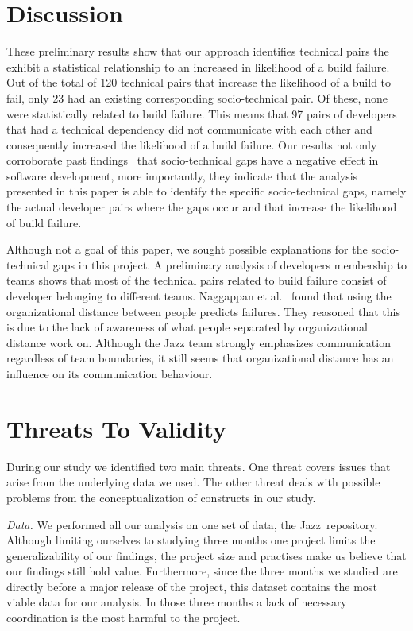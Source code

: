 \documentclass[conference]{IEEEtran}
\begin{document}
\section{Discussion}
These preliminary results show that our approach identifies technical pairs the exhibit a statistical relationship to an increased in likelihood of a build failure.
Out of the total of 120 technical pairs that increase the likelihood of a
build to fail, only 23 had an existing
corresponding socio-technical pair. Of these, none were statistically
related to build failure. This means that 97 pairs of developers that had a
technical dependency did not communicate with each other and
consequently increased the likelihood of a build failure. Our results not only
corroborate past findings~\cite{cataldo:cscw:2006,cataldo:esem:2008} that socio-technical gaps
have a negative effect in software development, more importantly, they indicate
that the analysis presented in this paper is able to identify the specific
socio-technical gaps, namely the actual developer pairs where the gaps occur
and that increase the likelihood of build failure. 

Although not a goal of this paper, we sought possible explanations for the
socio-technical gaps in this project. A preliminary analysis of developers
membership to teams shows that most
of the technical pairs related to build failure consist of developer belonging to
different teams. Naggappan et al.~\cite{nagappan:icse:2008} found that using the
organizational distance between people predicts failures. They reasoned that this
is due to the lack of awareness of what people separated by organizational distance
work on. Although the Jazz team strongly emphasizes communication
regardless of team boundaries, it still seems that organizational distance has
an influence on its communication behaviour.


\section{Threats To Validity}
\label{sec:threats}
During our study we identified two main threats. 
One threat covers issues that arise from the underlying data we used.
The other threat deals with possible problems from the conceptualization of
constructs in our study.

\emph{Data.}
We performed all our analysis on one set of data, the Jazz\texttrademark\
repository. 
Although limiting ourselves to studying three months one project limits the generalizability of our findings, the  
project size and practises make us believe that our findings still hold value.
Furthermore, since the three months  we studied are directly before a major release of the project, this dataset contains the most viable data for our analysis. In those three months a lack of necessary coordination is the most harmful to the project.
\end{document}
